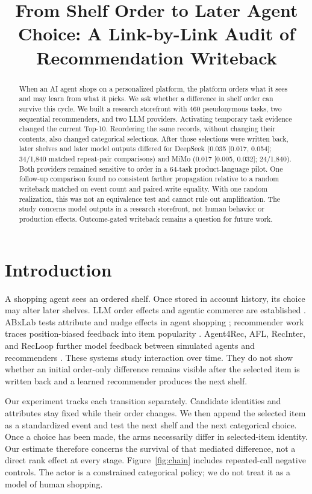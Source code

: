 \documentclass[sigconf,review,anonymous]{acmart}
\title{From Shelf Order to Later Agent Choice: A Link-by-Link Audit of Recommendation Writeback}
\begin{document}
\begin{abstract}
When an AI agent shops on a personalized platform, the platform orders what it
sees and may learn from what it picks. We ask whether a difference in shelf
order can survive this cycle. We built a research storefront with 460
pseudonymous tasks, two sequential recommenders, and two LLM providers.
Activating temporary task evidence changed the current Top-10. Reordering the
same records, without changing their contents, also changed categorical
selections. After those selections were written back, later shelves and later
model outputs differed for DeepSeek (0.035 [0.017, 0.054]; 34/1,840 matched
repeat-pair comparisons) and MiMo (0.017 [0.005, 0.032]; 24/1,840). Both
providers remained sensitive to order in a 64-task product-language pilot. One
follow-up comparison found no consistent farther propagation relative to a
random writeback matched on event count and paired-write equality. With one
random realization, this was not an equivalence test and cannot rule out
amplification. The study concerns model outputs in a research storefront, not
human behavior or production effects. Outcome-gated writeback remains a
question for future work.
\end{abstract}

\maketitle

\section{Introduction}

A shopping agent sees an ordered shelf. Once stored in account history, its
choice may alter later shelves. LLM order effects and agentic commerce are
established \cite{bito2025position,allouah2025agentbuying,zhang2026ranked}.
ABxLab tests attribute and nudge effects in agent shopping
\cite{cherep2026abxlab}; recommender work traces position-biased feedback into
item popularity \cite{dzhoha2024position}. Agent4Rec, AFL, RecInter, and
RecLoop further model feedback between simulated agents and recommenders
\cite{zhang2024agent4rec,cai2025afl,jin2025recinter,yang2026recloop}. These
systems study interaction over time. They do not show whether an initial
order-only difference remains visible after the selected item is written back
and a learned recommender produces the next shelf.

Our experiment tracks each transition separately. Candidate identities and
attributes stay fixed while their order changes. We then append the selected item as a
standardized event and test the next shelf and the next categorical choice.
Once a choice has been made, the arms necessarily differ in selected-item
identity. Our estimate therefore concerns the survival of that mediated
difference, not a direct rank effect at every stage. Figure~\ref{fig:chain}
includes repeated-call negative controls. The actor is a constrained
categorical policy; we do not treat it as a model of human shopping.
\end{document}
